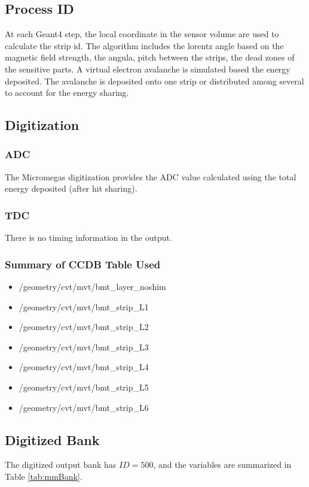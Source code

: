 \subsection{Process ID}
At each Geant4 step, the local coordinate in the sensor volume are used to calculate the strip id.
The algorithm includes the lorentz angle based on the magnetic field strength, the angula, pitch between the strips,
the dead zones of the sensitive parts. A virtual electron avalanche is simulated based the energy deposited. The avalanche
is deposited onto one strip or distributed among several to account for the energy sharing.



\subsection{Digitization}

\subsubsection{ADC}
The Micromegas digitization provides the ADC value calculated using the total energy deposited (after hit sharing).


\subsubsection{TDC}
There is no timing information in the output.

\subsubsection{Summary of CCDB Table Used}

\begin{itemize}
	\item /geometry/cvt/mvt/bmt\_layer\_noshim
	\item /geometry/cvt/mvt/bmt\_strip\_L1
	\item /geometry/cvt/mvt/bmt\_strip\_L2
	\item /geometry/cvt/mvt/bmt\_strip\_L3
	\item /geometry/cvt/mvt/bmt\_strip\_L4
	\item /geometry/cvt/mvt/bmt\_strip\_L5
	\item /geometry/cvt/mvt/bmt\_strip\_L6
\end{itemize}


\subsection{Digitized Bank}
The digitized output bank has $ID=500$, and the variables are summarized in Table \ref{tab:mmBank}.


